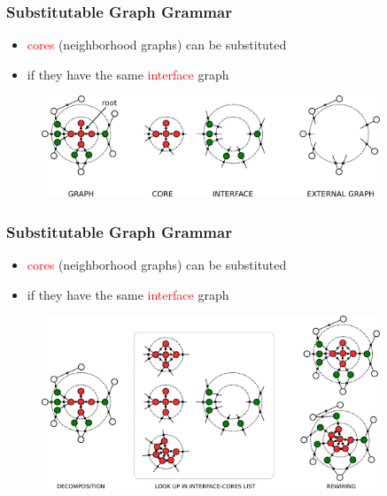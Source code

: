 \documentclass{beamer}
\newcommand{\red}[1]{\textcolor{red}{#1}}
\begin{document}
\begin{frame}
    \frametitle{Substitutable Graph Grammar}
    \begin{itemize}
        \item \red{cores} (neighborhood graphs) can be substituted  
        \item if they have the same \red{interface} graph
    \end{itemize}
    \begin{figure}[ht]
        \centering
        \includegraphics[width=0.9\textwidth]{images/cip1.pdf}
    \end{figure}
\end{frame}

\begin{frame}
    \frametitle{Substitutable Graph Grammar}
    \begin{itemize}
        \item \red{cores} (neighborhood graphs) can be substituted  
        \item if they have the same \red{interface} graph
    \end{itemize}
    \begin{figure}[ht]
        \centering
        \includegraphics[width=0.9\textwidth]{images/cip2.pdf}
    \end{figure}
\end{frame}
\end{document}
